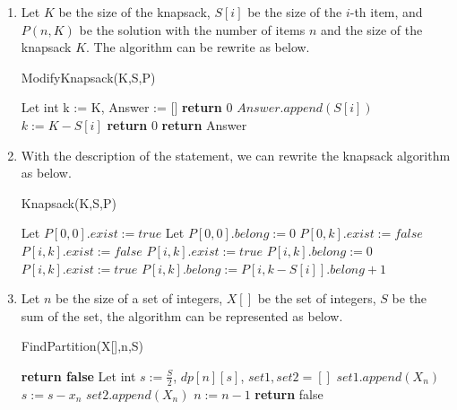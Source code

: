 \documentclass[a4paper,12pt]{article}
\begin{document}
\begin{enumerate}

\item { Let $K$ be the size of the knapsack, $S[i]$ be the size of the $i$-th item, and $P(n,K)$ be the solution with the number of items $n$ and the size of the knapsack $K$. The algorithm can be rewrite as below.

\begin{algorithm}
	\caption{ModifyKnapsack(K,S,P)} 
	\begin{algorithmic}[1]
	\State Let int k := K, Answer := []
		        \State \textbf{return} 0
		\EndIf
		        \State $Answer.append(S[i])$
		        \State $k := K - S[i]$
		\EndIf
		\EndFor
		    \State \textbf{return} 0
		\EndIf
	\State \textbf{return} Answer
	\end{algorithmic} 
\end{algorithm}
}
\newpage
\item{ With the description of the statement, we can rewrite the knapsack algorithm as below.
\begin{algorithm}
	\caption{Knapsack(K,S,P)} 
	\begin{algorithmic}[1]
	\State Let $P[0,0].exist := true$
	\State Let $P[0,0].belong := 0$
		\State $P[0,k].exist := false$
	\EndFor
	        \State $P[i,k].exist := false$
	            \State $P[i,k].exist := true$
	            \State $P[i,k].belong := 0$
	                \State $P[i,k].exist := true$
	                \State $P[i,k].belong := P[i, k - S[i]].belong + 1$
	            \EndIf
	        \EndIf
	    \EndFor
	\EndFor
	\end{algorithmic} 
\end{algorithm}

}
\newpage
\item { Let $n$ be the size of a set of integers, $X[]$ be the set of integers, $S$ be the sum of the set, the algorithm can be represented as below.
\begin{algorithm}
	\caption{FindPartition(X[],n,S)} 
	\begin{algorithmic}[1]
	    \State \textbf{return false}
	\EndIf
	\State Let int $s := \frac{S}{2}$, $dp[n][s]$, $set1, set2 = []$
	            \State $set1.append(X_n)$
	            \State $s := s - x_n$
	        \Else
	            \State $set2.append(X_n)$
	        \EndIf
	        \State $n := n-1$
	   \EndWhile
	\Else
	    \State \textbf{return} false
    \end{algorithmic} 
\end{algorithm}
}



\end{enumerate}
\end{document}
